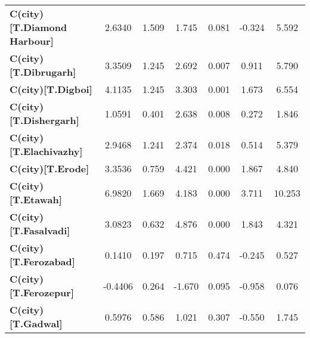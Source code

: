 \begin{center}
\begin{tabular}{lcccccc}
\textbf{C(city)[T.Diamond Harbour]}                                                                 &       2.6340  &        1.509     &     1.745  &         0.081        &       -0.324    &        5.592     \\
\textbf{C(city)[T.Dibrugarh]}                                                                       &       3.3509  &        1.245     &     2.692  &         0.007        &        0.911    &        5.790     \\
\textbf{C(city)[T.Digboi]}                                                                          &       4.1135  &        1.245     &     3.303  &         0.001        &        1.673    &        6.554     \\
\textbf{C(city)[T.Dishergarh]}                                                                      &       1.0591  &        0.401     &     2.638  &         0.008        &        0.272    &        1.846     \\
\textbf{C(city)[T.Elachivazhy]}                                                                     &       2.9468  &        1.241     &     2.374  &         0.018        &        0.514    &        5.379     \\
\textbf{C(city)[T.Erode]}                                                                           &       3.3536  &        0.759     &     4.421  &         0.000        &        1.867    &        4.840     \\
\textbf{C(city)[T.Etawah]}                                                                          &       6.9820  &        1.669     &     4.183  &         0.000        &        3.711    &       10.253     \\
\textbf{C(city)[T.Fasalvadi]}                                                                       &       3.0823  &        0.632     &     4.876  &         0.000        &        1.843    &        4.321     \\
\textbf{C(city)[T.Ferozabad]}                                                                       &       0.1410  &        0.197     &     0.715  &         0.474        &       -0.245    &        0.527     \\
\textbf{C(city)[T.Ferozepur]}                                                                       &      -0.4406  &        0.264     &    -1.670  &         0.095        &       -0.958    &        0.076     \\
\textbf{C(city)[T.Gadwal]}                                                                          &       0.5976  &        0.586     &     1.021  &         0.307        &       -0.550    &        1.745     \\

\end{tabular}
\end{center}
